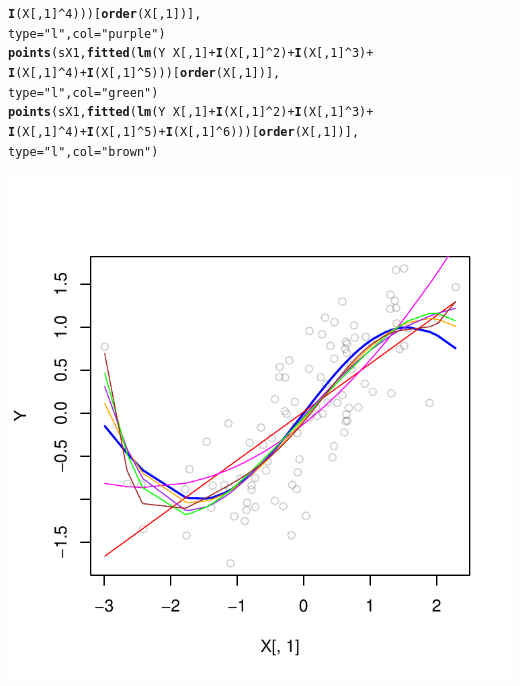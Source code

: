 \documentclass[a4paper]{article}
\makeatletter
\def\maxwidth{ %
  \ifdim\Gin@nat@width>\linewidth
    \linewidth
  \else
    \Gin@nat@width
  \fi
}
\newcommand{\hlnum}[1]{\textcolor[rgb]{0.686,0.059,0.569}{#1}}%
\newcommand{\hlstr}[1]{\textcolor[rgb]{0.192,0.494,0.8}{#1}}%
\newcommand{\hlopt}[1]{\textcolor[rgb]{0,0,0}{#1}}%
\newcommand{\hlstd}[1]{\textcolor[rgb]{0.345,0.345,0.345}{#1}}%
\newcommand{\hlkwc}[1]{\textcolor[rgb]{0.333,0.667,0.333}{#1}}%
\newcommand{\hlkwd}[1]{\textcolor[rgb]{0.737,0.353,0.396}{\textbf{#1}}}%
\newenvironment{kframe}{%
 \def\at@end@of@kframe{}%
 \ifinner\ifhmode%
  \def\at@end@of@kframe{\end{minipage}}%
  \begin{minipage}{\columnwidth}%
 \fi\fi%
 \def\FrameCommand##1{\hskip\@totalleftmargin \hskip-\fboxsep
 \colorbox{shadecolor}{##1}\hskip-\fboxsep
     \hskip-\linewidth \hskip-\@totalleftmargin \hskip\columnwidth}%
 \MakeFramed {\advance\hsize-\width
   \@totalleftmargin\z@ \linewidth\hsize
   \@setminipage}}%
 {\par\unskip\endMakeFramed%
 \at@end@of@kframe}
\newenvironment{knitrout}{}{} %
\makeatother
\begin{document}
{\begin{enumerate}
\begin{itemize}
\begin{knitrout}
\begin{kframe}
\begin{alltt}
                        \hlkwd{I}\hlstd{(X[,}\hlnum{1}\hlstd{]}\hlopt{^}\hlnum{4}\hlstd{)))[}\hlkwd{order}\hlstd{(X[,}\hlnum{1}\hlstd{])],}
       \hlkwc{type}\hlstd{=}\hlstr{"l"}\hlstd{,} \hlkwc{col}\hlstd{=}\hlstr{"purple"}\hlstd{)}
\hlkwd{points}\hlstd{(sX1,} \hlkwd{fitted}\hlstd{(}\hlkwd{lm}\hlstd{(Y} \hlopt{~} \hlstd{X[,}\hlnum{1}\hlstd{]} \hlopt{+} \hlkwd{I}\hlstd{(X[,}\hlnum{1}\hlstd{]}\hlopt{^}\hlnum{2}\hlstd{)} \hlopt{+} \hlkwd{I}\hlstd{(X[,}\hlnum{1}\hlstd{]}\hlopt{^}\hlnum{3}\hlstd{)} \hlopt{+}
                        \hlkwd{I}\hlstd{(X[,}\hlnum{1}\hlstd{]}\hlopt{^}\hlnum{4}\hlstd{)} \hlopt{+} \hlkwd{I}\hlstd{(X[,}\hlnum{1}\hlstd{]}\hlopt{^}\hlnum{5}\hlstd{)))[}\hlkwd{order}\hlstd{(X[,}\hlnum{1}\hlstd{])],}
       \hlkwc{type}\hlstd{=}\hlstr{"l"}\hlstd{,} \hlkwc{col}\hlstd{=}\hlstr{"green"}\hlstd{)}
\hlkwd{points}\hlstd{(sX1,} \hlkwd{fitted}\hlstd{(}\hlkwd{lm}\hlstd{(Y} \hlopt{~} \hlstd{X[,}\hlnum{1}\hlstd{]} \hlopt{+} \hlkwd{I}\hlstd{(X[,}\hlnum{1}\hlstd{]}\hlopt{^}\hlnum{2}\hlstd{)} \hlopt{+} \hlkwd{I}\hlstd{(X[,}\hlnum{1}\hlstd{]}\hlopt{^}\hlnum{3}\hlstd{)} \hlopt{+}
                        \hlkwd{I}\hlstd{(X[,}\hlnum{1}\hlstd{]}\hlopt{^}\hlnum{4}\hlstd{)} \hlopt{+} \hlkwd{I}\hlstd{(X[,}\hlnum{1}\hlstd{]}\hlopt{^}\hlnum{5}\hlstd{)} \hlopt{+} \hlkwd{I}\hlstd{(X[,}\hlnum{1}\hlstd{]}\hlopt{^}\hlnum{6}\hlstd{)))[}\hlkwd{order}\hlstd{(X[,}\hlnum{1}\hlstd{])],}
       \hlkwc{type}\hlstd{=}\hlstr{"l"}\hlstd{,} \hlkwc{col}\hlstd{=}\hlstr{"brown"}\hlstd{)}
\end{alltt}
\end{kframe}
\includegraphics[width=\maxwidth]{figure/unnamed-chunk-9-1} 

\end{knitrout}
\end{itemize}
\end{enumerate}}
\end{document}
